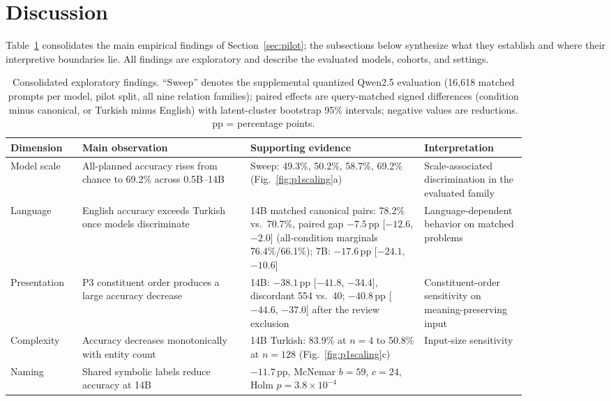 \section{Discussion}
\label{sec:discussion}

Table~\ref{tab:findings} consolidates the main empirical findings of Section~\ref{sec:pilot}; the
subsections below synthesize what they establish and where their interpretive boundaries lie. All findings are exploratory and describe the evaluated models, cohorts, and settings.

\begin{table}[t]
  \centering
  \caption{Consolidated exploratory findings. ``Sweep'' denotes the supplemental quantized Qwen2.5
  evaluation (16,618 matched prompts per model, pilot split, all nine relation families); paired effects
  are query-matched signed differences (condition minus canonical, or Turkish minus English) with
  latent-cluster bootstrap 95\% intervals; negative values are reductions. pp = percentage points.}
  \label{tab:findings}
  \small
  \setlength{\tabcolsep}{4.5pt}
  \begin{tabular}{@{}p{0.105\linewidth}p{0.29\linewidth}p{0.295\linewidth}p{0.175\linewidth}@{}}
    \toprule
    Dimension & Main observation & Supporting evidence & Interpretation \\
    \midrule
    Model scale & All-planned accuracy rises from chance to 69.2\% across 0.5B--14B &
      Sweep: 49.3\%, 50.2\%, 58.7\%, 69.2\% (Fig.~\ref{fig:p1scaling}a) &
      Scale-associated discrimination in the evaluated family \\
    Language & English accuracy exceeds Turkish once models discriminate &
      14B matched canonical pairs: 78.2\% vs.\ 70.7\%, paired gap $-7.5$\,pp [$-12.6$, $-2.0$]
      (all-condition marginals 76.4\%/66.1\%); 7B: $-17.6$\,pp [$-24.1$, $-10.6$] &
      Language-dependent behavior on matched problems \\
    Presentation & P3 constituent order produces a large accuracy decrease &
      14B: $-38.1$\,pp [$-41.8$, $-34.4$], discordant 554 vs.\ 40; $-40.8$\,pp [$-44.6$, $-37.0$] after
      the review exclusion & Constituent-order sensitivity on meaning-preserving input \\
    Complexity & Accuracy decreases monotonically with entity count &
      14B Turkish: 83.9\% at $n{=}4$ to 50.8\% at $n{=}128$ (Fig.~\ref{fig:p1scaling}c) &
      Input-size sensitivity \\
    Naming & Shared symbolic labels reduce accuracy at 14B &
      $-11.7$\,pp, McNemar $b{=}59$, $c{=}24$, Holm $p = 3.8\times10^{-4}$ &

\end{tabular}
\end{table}
